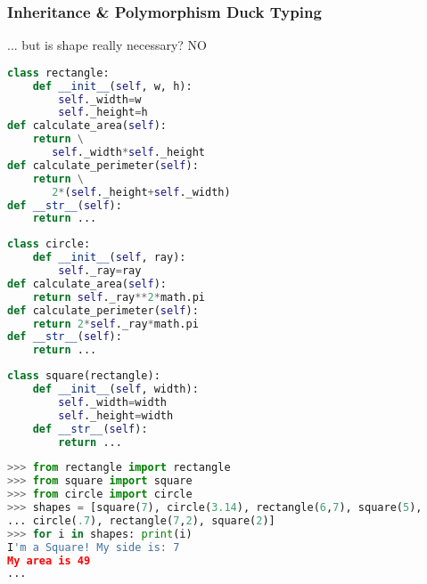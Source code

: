 \subsubsection{Inheritance \& Polymorphism Duck Typing}

... but is shape really necessary? NO

\begin{lstlisting}[language=Python]
class rectangle:
	def __init__(self, w, h):
		self._width=w
		self._height=h
def calculate_area(self):
	return \
	   self._width*self._height
def calculate_perimeter(self):
	return \
	   2*(self._height+self._width)
def __str__(self):
	return ...
\end{lstlisting}

\begin{lstlisting}[language=Python]
class circle:
	def __init__(self, ray):
		self._ray=ray
def calculate_area(self):
	return self._ray**2*math.pi
def calculate_perimeter(self):
	return 2*self._ray*math.pi
def __str__(self):
	return ...
\end{lstlisting}

\begin{lstlisting}[language=Python]
class square(rectangle): 
	def __init__(self, width):
		self._width=width
		self._height=width
	def __str__(self):
		return ...
\end{lstlisting}

\begin{lstlisting}[language=Python]
>>> from rectangle import rectangle
>>> from square import square
>>> from circle import circle
>>> shapes = [square(7), circle(3.14), rectangle(6,7), square(5),
... circle(.7), rectangle(7,2), square(2)]
>>> for i in shapes: print(i)
I'm a Square! My side is: 7
My area is 49
... 
\end{lstlisting}
